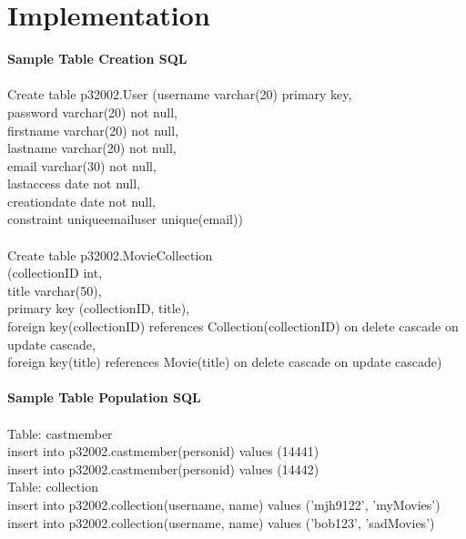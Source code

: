 \documentclass[12pt]{article}
\begin{document}
    \section{Implementation}
    \textbf{Sample Table Creation SQL}\\ \\
    Create table p320\textunderscore 02.User
    (username varchar(20) primary key, \\
    password varchar(20) not null,\\
    first\textunderscore name varchar(20) not null,\\
    last\textunderscore name varchar(20) not null,\\
    email varchar(30) not null,\\
    last\textunderscore access date not null,\\
    creation\textunderscore date date not null,\\
    constraint unique\textunderscore email\textunderscore user unique(email))\\ \\


    \noindent Create table p320\textunderscore 02.Movie\textunderscore Collection\\
    (collection\textunderscore ID int,\\
    title varchar(50),\\
    primary key (collection\textunderscore ID, title),\\
    foreign key(collection\textunderscore ID) references Collection(collection\textunderscore ID) on delete cascade on update cascade,\\
    foreign key(title) references Movie(title) on delete cascade on update cascade)\\ \\

    \noindent\textbf{Sample Table Population SQL} \\ \\
    \noindent Table: cast\textunderscore member \\
    insert into p320\textunderscore02.cast\textunderscore member(person\textunderscore id)
    values (14441)\\
    insert into p320\textunderscore02.cast\textunderscore member(person\textunderscore id)
    values (14442)\\

    \noindent Table: collection \\
    insert into p320\textunderscore02.collection(username, name)
    values ('mjh9122', 'myMovies')\\
    insert into p320\textunderscore02.collection(username, name)
    values ('bob123', 'sadMovies')\\
\end{document}
